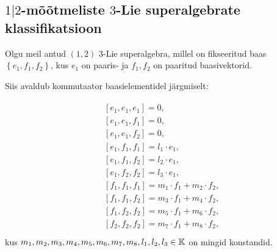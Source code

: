 
\subsection{\texorpdfstring{$1|2$}{1|2}-mõõtmeliste \texorpdfstring{$3$}{3}-Lie superalgebrate klassifikatsioon}

Olgu meil antud $(1, 2)$ 3-Lie superalgebra, millel on fikseeritud baas
$\left\{ e_1, f_1, f_2 \right\}$, kus $e_1$ on paaris- ja
$f_1, f_2$ on paaritud baasivektorid.

Siis avaldub kommutaator baasielementidel järgmiselt:

\begin{align}\label{samasused:1-2}
    \begin{split}
        & \left[ e_1, e_1, e_1 \right] = 0, \\
        & \left[ e_1, e_1, f_1 \right] = 0, \\
        & \left[ e_1, e_1, f_2 \right] = 0, \\
        & \left[ e_1, f_1, f_1 \right] = l_1 \cdot e_1, \\
        & \left[ e_1, f_1, f_2 \right] = l_2 \cdot e_1, \\
        & \left[ e_1, f_2, f_2 \right] = l_3 \cdot e_1, \\
        & \left[ f_1, f_1, f_1 \right] = m_1 \cdot f_1 + m_2 \cdot f_2, \\
        & \left[ f_1, f_1, f_2 \right] = m_3 \cdot f_1 + m_4 \cdot f_2, \\
        & \left[ f_1, f_2, f_2 \right] = m_5 \cdot f_1 + m_6 \cdot f_2, \\
        & \left[ f_2, f_2, f_2 \right] = m_7 \cdot f_1 + m_8 \cdot f_2, \\
    \end{split}
\end{align}
kus $m_1, m_2, m_3, m_4, m_5, m_6, m_7, m_8, l_1, l_2, l_3 \in \mathbb{K}$
on mingid konstandid.

